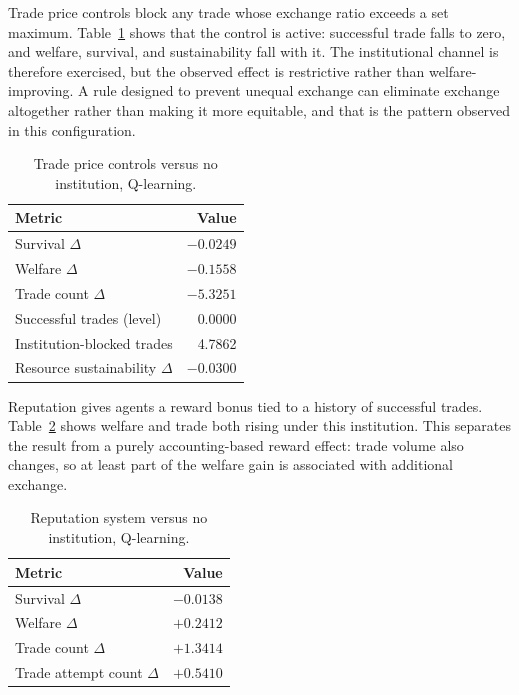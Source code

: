 \documentclass[11pt]{article}
\begin{document}
Trade price controls block any trade whose exchange ratio exceeds a set
maximum. Table~\ref{tab:resource-pricecontrol} shows that the control is active:
successful trade falls to zero, and welfare, survival, and sustainability fall
with it. The institutional channel is therefore exercised, but the observed
effect is restrictive rather than welfare-improving. A rule designed to prevent
unequal exchange can eliminate exchange altogether rather than making it more
equitable, and that is the pattern observed in this configuration.

\begin{table}[h]
\centering
\begin{tabular}{lr}
\toprule
Metric & Value \\
\midrule
Survival \(\Delta\) & \(-0.0249\) \\
Welfare \(\Delta\) & \(-0.1558\) \\
Trade count \(\Delta\) & \(-5.3251\) \\
Successful trades (level) & 0.0000 \\
Institution-blocked trades & 4.7862 \\
Resource sustainability \(\Delta\) & \(-0.0300\) \\
\bottomrule
\end{tabular}
\caption{Trade price controls versus no institution, Q-learning.}
\label{tab:resource-pricecontrol}
\end{table}

Reputation gives agents a reward bonus tied to a history of successful trades.
Table~\ref{tab:resource-reputation} shows welfare and trade both rising under
this institution. This separates the result from a purely accounting-based
reward effect: trade volume also changes, so at least part of the welfare gain
is associated with additional exchange.

\begin{table}[h]
\centering
\begin{tabular}{lr}
\toprule
Metric & Value \\
\midrule
Survival \(\Delta\) & \(-0.0138\) \\
Welfare \(\Delta\) & \(+0.2412\) \\
Trade count \(\Delta\) & \(+1.3414\) \\
Trade attempt count \(\Delta\) & \(+0.5410\) \\
\bottomrule
\end{tabular}
\caption{Reputation system versus no institution, Q-learning.}
\label{tab:resource-reputation}
\end{table}
\end{document}
